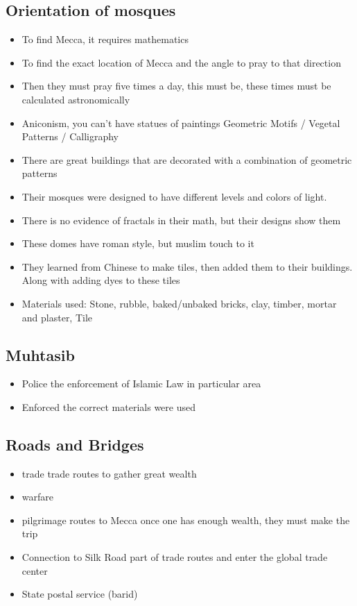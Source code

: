 \documentclass{article}
\begin{document}
\subsection{Orientation of mosques}
\begin{itemize}
  \item To find Mecca, it requires mathematics
  \item To find the exact location of Mecca and the angle
    to pray to that direction
  \item Then they must pray five times a day,
    this must be, these times must be calculated astronomically
  \item Aniconism, you can't have statues of paintings
    \rightarrow{} Geometric Motifs / Vegetal Patterns / Calligraphy
  \item There are great buildings that are decorated with a combination of geometric
    patterns

  \item Their mosques were designed to have different levels and colors of light.
  \item There is no evidence of fractals in their math, but their designs show them
  \item These domes have roman style, but muslim touch to it
  \item They learned from Chinese to make tiles, then added them to their
    buildings. Along with adding dyes to these tiles
  \item Materials used: Stone, rubble, baked/unbaked bricks,
    clay, timber, mortar and plaster, Tile
\end{itemize}

\subsection{Muhtasib}
\begin{itemize}
  \item Police the enforcement of Islamic Law
    in particular area
  \item Enforced the correct materials were used
\end{itemize}

\subsection{Roads and Bridges}
\begin{itemize}
  \item trade \rightarrow{} trade routes to gather great wealth
  \item warfare
  \item pilgrimage routes to Mecca \rightarrow{} once one has enough wealth, they must make the trip
  \item Connection to Silk Road \rightarrow{} part of trade routes and enter the global trade center
  \item State postal service (barid) \rightarrow{}
\end{itemize}
\end{document}
